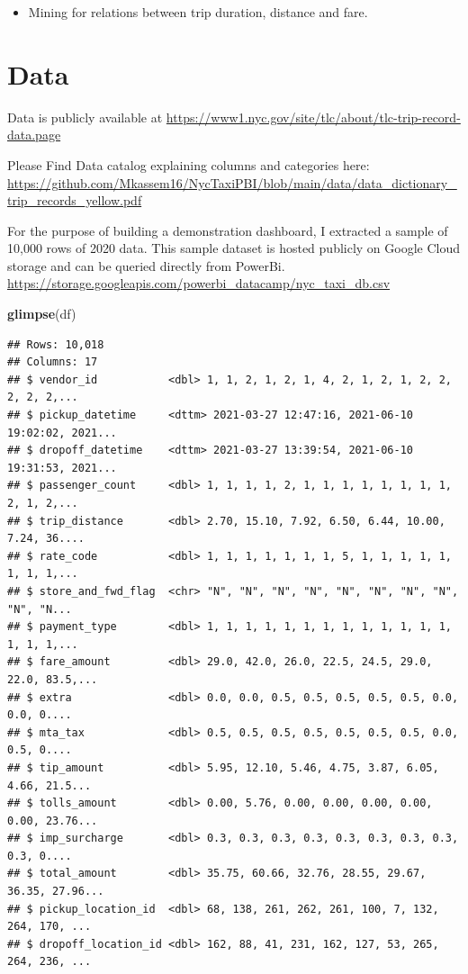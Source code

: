 \documentclass[
]{book}
\newenvironment{Shaded}{\begin{snugshade}}{\end{snugshade}}
\newcommand{\KeywordTok}[1]{\textcolor[rgb]{0.13,0.29,0.53}{\textbf{#1}}}
\newcommand{\NormalTok}[1]{#1}
\providecommand{\tightlist}{%
  \setlength{\itemsep}{0pt}\setlength{\parskip}{0pt}}
\begin{document}
\begin{itemize}
\tightlist
\item
  Mining for relations between trip duration, distance and fare.
\end{itemize}

\hypertarget{data}{%
\chapter{Data}\label{data}}

Data is publicly available at \url{https://www1.nyc.gov/site/tlc/about/tlc-trip-record-data.page}

Please Find Data catalog explaining columns and categories here: \url{https://github.com/Mkassem16/NycTaxiPBI/blob/main/data/data_dictionary_trip_records_yellow.pdf}

For the purpose of building a demonstration dashboard, I extracted a sample of 10,000 rows of 2020 data. This sample dataset is hosted publicly on Google Cloud storage and can be queried directly from PowerBi.
\url{https://storage.googleapis.com/powerbi_datacamp/nyc_taxi_db.csv}

\begin{Shaded}
\begin{Highlighting}[]
\KeywordTok{glimpse}\NormalTok{(df)}
\end{Highlighting}
\end{Shaded}

\begin{verbatim}
## Rows: 10,018
## Columns: 17
## $ vendor_id           <dbl> 1, 1, 2, 1, 2, 1, 4, 2, 1, 2, 1, 2, 2, 2, 2, 2,...
## $ pickup_datetime     <dttm> 2021-03-27 12:47:16, 2021-06-10 19:02:02, 2021...
## $ dropoff_datetime    <dttm> 2021-03-27 13:39:54, 2021-06-10 19:31:53, 2021...
## $ passenger_count     <dbl> 1, 1, 1, 1, 2, 1, 1, 1, 1, 1, 1, 1, 1, 2, 1, 2,...
## $ trip_distance       <dbl> 2.70, 15.10, 7.92, 6.50, 6.44, 10.00, 7.24, 36....
## $ rate_code           <dbl> 1, 1, 1, 1, 1, 1, 1, 5, 1, 1, 1, 1, 1, 1, 1, 1,...
## $ store_and_fwd_flag  <chr> "N", "N", "N", "N", "N", "N", "N", "N", "N", "N...
## $ payment_type        <dbl> 1, 1, 1, 1, 1, 1, 1, 1, 1, 1, 1, 1, 1, 1, 1, 1,...
## $ fare_amount         <dbl> 29.0, 42.0, 26.0, 22.5, 24.5, 29.0, 22.0, 83.5,...
## $ extra               <dbl> 0.0, 0.0, 0.5, 0.5, 0.5, 0.5, 0.5, 0.0, 0.0, 0....
## $ mta_tax             <dbl> 0.5, 0.5, 0.5, 0.5, 0.5, 0.5, 0.5, 0.0, 0.5, 0....
## $ tip_amount          <dbl> 5.95, 12.10, 5.46, 4.75, 3.87, 6.05, 4.66, 21.5...
## $ tolls_amount        <dbl> 0.00, 5.76, 0.00, 0.00, 0.00, 0.00, 0.00, 23.76...
## $ imp_surcharge       <dbl> 0.3, 0.3, 0.3, 0.3, 0.3, 0.3, 0.3, 0.3, 0.3, 0....
## $ total_amount        <dbl> 35.75, 60.66, 32.76, 28.55, 29.67, 36.35, 27.96...
## $ pickup_location_id  <dbl> 68, 138, 261, 262, 261, 100, 7, 132, 264, 170, ...
## $ dropoff_location_id <dbl> 162, 88, 41, 231, 162, 127, 53, 265, 264, 236, ...
\end{verbatim}
\end{document}
